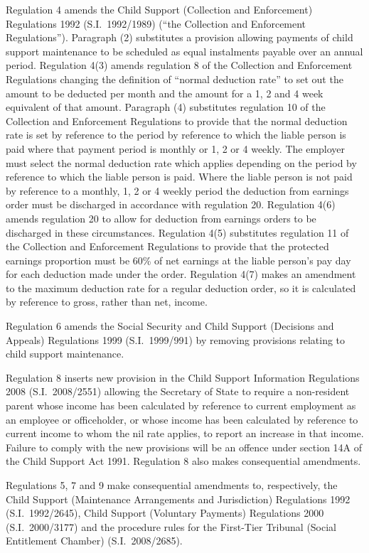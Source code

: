 \documentclass[12pt,a4paper]{article}
\begin{document}
Regulation 4 amends the Child Support (Collection and Enforcement) Regulations 1992 (S.I.~1992/1989) (“the Collection and Enforcement Regulations”). Paragraph (2) substitutes a provision allowing payments of child support maintenance to be scheduled as equal instalments payable over an annual period. Regulation 4(3) amends regulation 8 of the Collection and Enforcement Regulations changing the definition of “normal deduction rate” to set out the amount to be deducted per month and the amount for a 1, 2 and 4 week equivalent of that amount. Paragraph (4) substitutes regulation 10 of the Collection and Enforcement Regulations to provide that the normal deduction rate is set by reference to the period by reference to which the liable person is paid where that payment period is monthly or 1, 2 or 4 weekly. The employer must select the normal deduction rate which applies depending on the period by reference to which the liable person is paid. Where the liable person is not paid by reference to a monthly, 1, 2 or 4 weekly period the deduction from earnings order must be discharged in accordance with regulation 20. Regulation 4(6) amends regulation 20 to allow for deduction from earnings orders to be discharged in these circumstances. Regulation 4(5) substitutes regulation 11 of the Collection and Enforcement Regulations to provide that the protected earnings proportion must be 60\% of net earnings at the liable person’s pay day for each deduction made under the order. Regulation 4(7) makes an amendment to the maximum deduction rate for a regular deduction order, so it is calculated by reference to gross, rather than net, income.

Regulation 6 amends the Social Security and Child Support (Decisions and Appeals) Regulations 1999 (S.I.~1999/991) by removing provisions relating to child support maintenance.

Regulation 8 inserts new provision in the Child Support Information Regulations 2008 (S.I.~2008/2551) allowing the Secretary of State to require a non-resident parent whose income has been calculated by reference to current employment as an employee or officeholder, or whose income has been calculated by reference to current income to whom the nil rate applies, to report an increase in that income. Failure to comply with the new provisions will be an offence under section 14A of the Child Support Act 1991. Regulation 8 also makes consequential amendments.

Regulations 5, 7 and 9 make consequential amendments to, respectively, the Child Support (Maintenance Arrangements and Jurisdiction) Regulations 1992 (S.I.~1992/2645), Child Support (Voluntary Payments) Regulations 2000 (S.I.~2000/3177) and the procedure rules for the First-Tier Tribunal (Social Entitlement Chamber) (S.I.~2008/2685).
\end{document}
